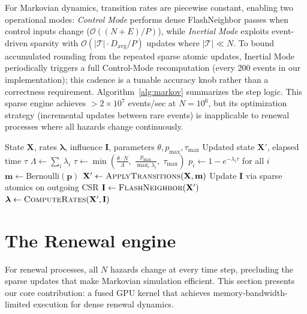 \documentclass[a4paper,fleqn]{cas-sc}
\theoremstyle{definition}
\theoremstyle{remark}
\newcommand{\bigO}{\mathcal{O}}
\begin{document}
For Markovian dynamics\label{sec:markov_engine}, transition rates are piecewise constant, enabling two operational modes: \emph{Control Mode} performs dense FlashNeighbor passes when control inputs change ($\bigO((N + E)/P)$), while \emph{Inertial Mode} exploits event-driven sparsity with $\bigO(|\mathcal{T}| \cdot D_{\text{avg}} / P)$ updates where $|\mathcal{T}| \ll N$. To bound accumulated rounding from the repeated sparse atomic updates, Inertial Mode periodically triggers a full Control-Mode recomputation (every 200 events in our implementation); this cadence is a tunable accuracy knob rather than a correctness requirement. Algorithm~\ref{alg:markov} summarizes the step logic. This sparse engine achieves $>2 \times 10^7$ events/sec at $N = 10^6$, but its optimization strategy (incremental updates between rare events) is inapplicable to renewal processes where all hazards change continuously.

\begin{algorithm}[!h]
\caption{Markovian Engine: One Tau-Leaping Step}
\label{alg:markov}
\begin{algorithmic}[1]
\Require State $\mathbf{X}$, rates $\bm{\lambda}$, influence $\mathbf{I}$, parameters $\theta, p_{\max}, \tau_{\max}$
\Ensure Updated state $\mathbf{X}'$, elapsed time $\tau$
\State $\Lambda \leftarrow \sum_i \lambda_i$ 
\State $\tau \leftarrow \min\!\left(\frac{\theta \cdot N}{\Lambda},\; \frac{p_{\max}}{\max_i \lambda_i},\; \tau_{\max}\right)$
\State $p_i \leftarrow 1 - e^{-\lambda_i \tau}$ for all $i$ 
\State $\mathbf{m} \leftarrow \text{Bernoulli}(\mathbf{p})$ 
\State $\mathbf{X}' \leftarrow \textsc{ApplyTransitions}(\mathbf{X}, \mathbf{m})$
    \State Update $\mathbf{I}$ via sparse atomics on outgoing CSR
\Else
    \State $\mathbf{I} \leftarrow \textsc{FlashNeighbor}(\mathbf{X}')$ 
\EndIf
\State $\bm{\lambda} \leftarrow \textsc{ComputeRates}(\mathbf{X}', \mathbf{I})$
\end{algorithmic}
\end{algorithm}

\section{The Renewal engine}\label{sec:renewal_engine}

For renewal processes, all $N$ hazards change at every time step, precluding the sparse updates that make Markovian simulation efficient. This section presents our core contribution: a fused GPU kernel that achieves memory-bandwidth-limited execution for dense renewal dynamics.
\end{document}
